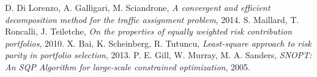 D. Di Lorenzo, A. Galligari, M. Sciandrone,
  \emph{A convergent and efficient decomposition method for the traffic assignment problem},
  2014.
S. Maillard, T. Roncalli, J. Teiletche,
\emph{On the properties of equally weighted risk contribution portfolios}, 
2010.
  X. Bai, K. Scheinberg, R. Tutuncu,
  \emph{Least-square approach to risk parity in portfolio selection},
  2013.   
	P. E. Gill, W. Murray, M. A. Sanders,
	\emph{SNOPT: An SQP Algorithm for large-scale constrained optimization}, 
	2005.
